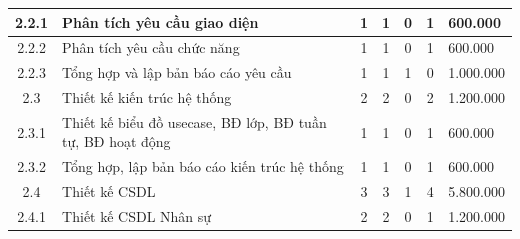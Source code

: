 \begin{longtable}{|c|p{3cm}|c|c|c|c|p{3cm}|}
    2.2.1                           & Phân tích yêu cầu giao diện                                   & 1                                              & 1                                               & 0                                                               & 1                  & 600.000    \\ \hline
    2.2.2                           & Phân tích yêu cầu chức năng                                   & 1                                              & 1                                               & 0                                                               & 1                  & 600.000    \\ \hline
    2.2.3                           & Tổng hợp và lập bản báo cáo yêu cầu                           & 1                                              & 1                                               & 1                                                               & 0                  & 1.000.000  \\ \hline
    2.3                             & Thiết kế kiến trúc hệ thống                                   & 2                                              & 2                                               & 0                                                               & 2                  & 1.200.000  \\ \hline
    2.3.1                           & Thiết kế biểu đồ usecase, BĐ lớp, BĐ tuần tự, BĐ hoạt động    & 1                                              & 1                                               & 0                                                               & 1                  & 600.000    \\ \hline
    2.3.2                           & Tổng hợp, lập bản báo cáo kiến trúc hệ thống                  & 1                                              & 1                                               & 0                                                               & 1                  & 600.000    \\ \hline
    2.4                             & Thiết kế CSDL                                                 & 3                                              & 3                                               & 1                                                               & 4                  & 5.800.000  \\ \hline
    2.4.1                           & Thiết kế CSDL Nhân sự                                         & 2                                              & 2                                               & 0                                                               & 1                  & 1.200.000  \\ \hline

\end{longtable}
